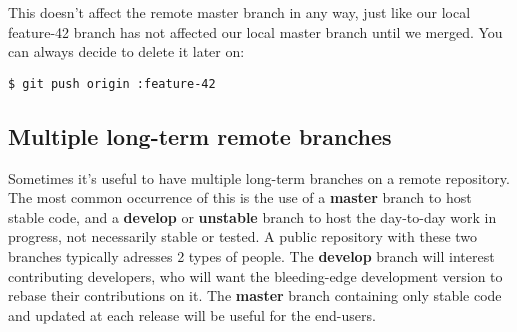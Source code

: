 \documentclass{../common/tufte-latex/tufte-handout}
\begin{document}
This doesn't affect the remote master branch in any way, just like our local feature-42 branch has not affected our local master branch until we merged.
You can always decide to delete it later on:
\begin{lstlisting}[style=BashInputStyle]
  $ git push origin :feature-42
\end{lstlisting}

\subsection{Multiple long-term remote branches}
Sometimes it's useful to have multiple long-term branches on a remote repository.
The most common occurrence of this is the use of a \textbf{master} branch to host stable code, and a \textbf{develop} or \textbf{unstable} branch to host the day-to-day work in progress, not necessarily stable or tested.
A public repository with these two branches typically adresses 2 types of people.
The \textbf{develop} branch will interest contributing developers, who will want the bleeding-edge development version to rebase their contributions on it.
The \textbf{master} branch containing only stable code and updated at each release will be useful for the end-users.



\end{document}
